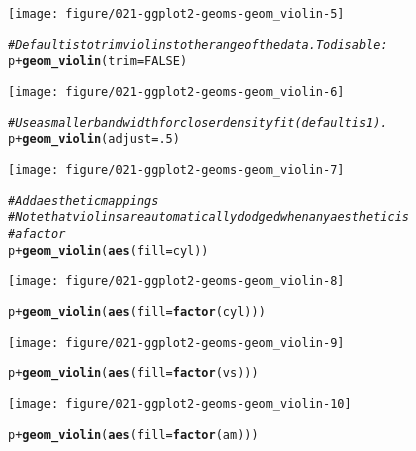 \documentclass[a4paper,titlepage]{tufte-handout}\usepackage[]{graphicx}\usepackage[]{color}
\makeatletter
\def\maxwidth{ %
  \ifdim\Gin@nat@width>\linewidth
    \linewidth
  \else
    \Gin@nat@width
  \fi
}
\newcommand{\hlnum}[1]{\textcolor[rgb]{0.686,0.059,0.569}{#1}}%
\newcommand{\hlcom}[1]{\textcolor[rgb]{0.678,0.584,0.686}{\textit{#1}}}%
\newcommand{\hlopt}[1]{\textcolor[rgb]{0,0,0}{#1}}%
\newcommand{\hlstd}[1]{\textcolor[rgb]{0.345,0.345,0.345}{#1}}%
\newcommand{\hlkwc}[1]{\textcolor[rgb]{0.333,0.667,0.333}{#1}}%
\newcommand{\hlkwd}[1]{\textcolor[rgb]{0.737,0.353,0.396}{\textbf{#1}}}%
\newenvironment{kframe}{%
 \def\at@end@of@kframe{}%
 \ifinner\ifhmode%
  \def\at@end@of@kframe{\end{minipage}}%
  \begin{minipage}{\columnwidth}%
 \fi\fi%
 \def\FrameCommand##1{\hskip\@totalleftmargin \hskip-\fboxsep
 \colorbox{shadecolor}{##1}\hskip-\fboxsep
     \hskip-\linewidth \hskip-\@totalleftmargin \hskip\columnwidth}%
 \MakeFramed {\advance\hsize-\width
   \@totalleftmargin\z@ \linewidth\hsize
   \@setminipage}}%
 {\par\unskip\endMakeFramed%
 \at@end@of@kframe}
\newenvironment{knitrout}{}{} %
\makeatother
\begin{document}
\begin{knitrout}
\texttt{[image: figure/021-ggplot2-geoms-geom\_violin-5]} 
\begin{kframe}\begin{alltt}
\hlcom{# Default is to trim violins to the range of the data. To disable:}
\hlstd{p} \hlopt{+} \hlkwd{geom_violin}\hlstd{(}\hlkwc{trim} \hlstd{=} \hlnum{FALSE}\hlstd{)}
\end{alltt}
\end{kframe}
\texttt{[image: figure/021-ggplot2-geoms-geom\_violin-6]} 
\begin{kframe}\begin{alltt}
\hlcom{# Use a smaller bandwidth for closer density fit (default is 1).}
\hlstd{p} \hlopt{+} \hlkwd{geom_violin}\hlstd{(}\hlkwc{adjust} \hlstd{=} \hlnum{.5}\hlstd{)}
\end{alltt}
\end{kframe}
\texttt{[image: figure/021-ggplot2-geoms-geom\_violin-7]} 
\begin{kframe}\begin{alltt}
\hlcom{# Add aesthetic mappings}
\hlcom{# Note that violins are automatically dodged when any aesthetic is}
\hlcom{# a factor}
\hlstd{p} \hlopt{+} \hlkwd{geom_violin}\hlstd{(}\hlkwd{aes}\hlstd{(}\hlkwc{fill} \hlstd{= cyl))}
\end{alltt}
\end{kframe}
\texttt{[image: figure/021-ggplot2-geoms-geom\_violin-8]} 
\begin{kframe}\begin{alltt}
\hlstd{p} \hlopt{+} \hlkwd{geom_violin}\hlstd{(}\hlkwd{aes}\hlstd{(}\hlkwc{fill} \hlstd{=} \hlkwd{factor}\hlstd{(cyl)))}
\end{alltt}
\end{kframe}
\texttt{[image: figure/021-ggplot2-geoms-geom\_violin-9]} 
\begin{kframe}\begin{alltt}
\hlstd{p} \hlopt{+} \hlkwd{geom_violin}\hlstd{(}\hlkwd{aes}\hlstd{(}\hlkwc{fill} \hlstd{=} \hlkwd{factor}\hlstd{(vs)))}
\end{alltt}
\end{kframe}
\texttt{[image: figure/021-ggplot2-geoms-geom\_violin-10]} 
\begin{kframe}\begin{alltt}
\hlstd{p} \hlopt{+} \hlkwd{geom_violin}\hlstd{(}\hlkwd{aes}\hlstd{(}\hlkwc{fill} \hlstd{=} \hlkwd{factor}\hlstd{(am)))}
\end{alltt}
\end{kframe}

\end{knitrout}
\end{document}

